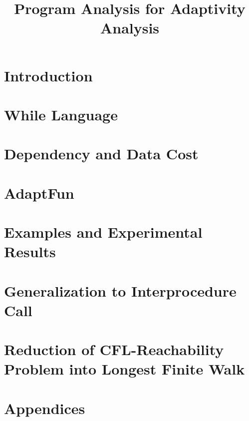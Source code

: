 \documentclass[a4paper,11pt]{article}
\newcommand{\highlight}[1]{\textcolor[rgb]{.0,0.0,1.0}{ #1}}
\newcommand{\THESYSTEM}{\textsf{AdaptFun}}
\begin{document}
\title{Program Analysis for Adaptivity Analysis}

\author{}

\date{}

\maketitle
%
\tableofcontents

% 
\section{Introduction}
% 

\section{{While Language}}
\label{sec:language}

\clearpage
\section{\highlight{Dependency and Data Cost}}
\label{sec:datacost}
% 

% 
\clearpage
\section{\THESYSTEM}
\label{sec:thesystem}



\clearpage
%
\section{Examples and Experimental Results}

% 

\section{Generalization to Interprocedure Call}

\section{Reduction of CFL-Reachability Problem into Longest Finite Walk}
%
\clearpage
\appendix
{}
\section*{Appendices}




\end{document}

